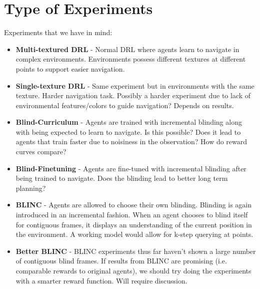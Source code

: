%


\section{Type of Experiments}
Experiments that we have in mind:
\begin{itemize}
    \item \textbf{Multi-textured DRL} - Normal DRL where agents learn to navigate in complex environments. 
          Environments possess different textures at different points to support easier navigation.
      \item \textbf{Single-texture DRL} - Same experiment but in environments with the same texture. Harder navigation task. Possibly a harder experiment due to lack of environmental features/colors to guide navigation? Depends on results. 
      \item \textbf{Blind-Curriculum} - Agents are trained with incremental blinding along with being expected to learn to navigate. Is this possible? Does it lead to agents that train faster due to noisiness in the observation? How do reward curves compare? 
      \item \textbf{Blind-Finetuning} - Agents are fine-tuned with incremental blinding after being trained to navigate. Does the blinding lead to better long term planning? 
      \item \textbf{BLINC} - Agents are allowed to choose their own blinding. Blinding is again introduced in an incremental fashion. When an agent chooses to blind itself for contiguous frames, it displays an understanding of the current position in the environment. A working model would allow for k-step querying at points.
      \item \textbf{Better BLINC} - BLINC experiments thus far haven't shown a large number of contiguous blind frames. If results from BLINC are promising (i.e. comparable rewards to original agents), we should try doing the experiments with a smarter reward function. Will require discussion.
\end{itemize}

